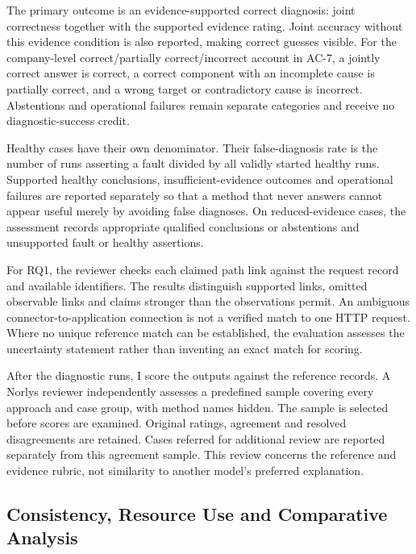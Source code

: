 The primary outcome is an evidence-supported correct diagnosis: joint
correctness together with the supported evidence rating. Joint accuracy
without this evidence condition is also reported, making correct guesses
visible. For the company-level correct/partially correct/incorrect account
in AC-7, a jointly correct answer is correct, a correct component with an
incomplete cause is partially correct, and a wrong target or contradictory
cause is incorrect. Abstentions and operational failures remain separate
categories and receive no diagnostic-success credit.

Healthy cases have their own denominator. Their false-diagnosis rate is
the number of runs asserting a fault divided by all validly started healthy
runs. Supported healthy conclusions, insufficient-evidence outcomes and
operational failures are reported separately so that a method that never
answers cannot appear useful merely by avoiding false diagnoses.
On reduced-evidence cases, the assessment records appropriate qualified
conclusions or abstentions and unsupported fault or healthy assertions.

For RQ1, the reviewer checks each claimed path link against the request
record and available identifiers. The results distinguish supported links,
omitted observable links and claims stronger than the observations permit.
An ambiguous connector-to-application connection is not a verified match
to one HTTP request. Where no unique reference match can be established,
the evaluation assesses the uncertainty statement rather than inventing
an exact match for scoring.

After the diagnostic runs, I score the outputs against the reference
records. A Norlys reviewer independently assesses a predefined sample
covering every approach and case group, with method names hidden. The
sample is selected before scores are examined. Original ratings,
agreement and resolved disagreements are retained. Cases referred for
additional review are reported separately from this agreement sample.
This review concerns the reference and evidence rubric, not similarity
to another model's preferred explanation.


\subsection{Consistency, Resource Use and Comparative Analysis}

